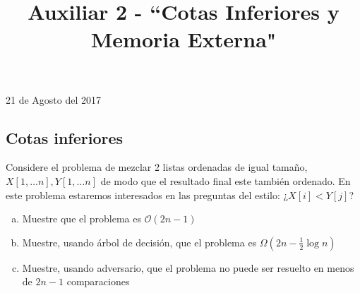 \documentclass[dcc,uchile]{fcfmcourse}
\title{Auxiliar 2 - ``Cotas Inferiores y Memoria Externa"}
\theoremstyle{plain}
\theoremstyle{definition}
\begin{document}
\maketitle
\begin{center}
21 de Agosto del 2017
\end{center}


\vspace{-1ex}


\begin{problems}
\section*{Cotas inferiores}
\problem Considere el problema de mezclar 2 listas ordenadas de igual tamaño, $X[1,\ldots n], Y[1,\ldots n]$ de modo que el resultado final este también ordenado. En este problema estaremos interesados en las preguntas del estilo: ¿$X[i]<Y[j]$?
\begin{enumerate}[a)]
    \item Muestre que el problema es $\mathcal{O}(2n-1)$
    \item Muestre, usando árbol de decisión, que el problema es $\Omega \left(2n-\frac{1}{2}\log n\right)$
    \item Muestre, usando adversario, que el problema no puede ser resuelto en menos de $2n-1$ comparaciones
\end{enumerate}

\end{problems}
\end{document}
